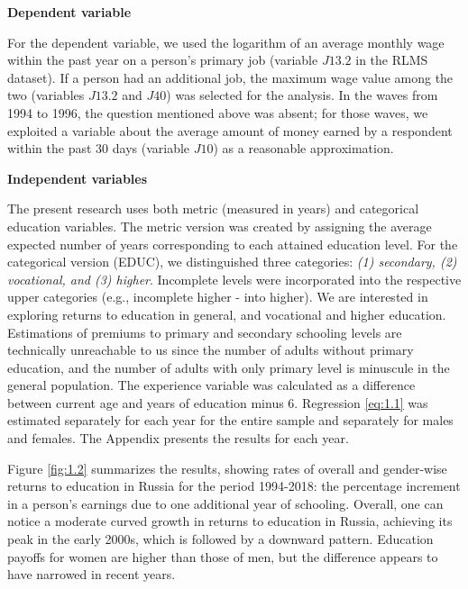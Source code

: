 \documentclass[alpha-refs]{wiley-article-01g}
\begin{document}

\textbf{Dependent variable}

For the dependent variable, we used the logarithm of an average monthly wage within the past year on a person's primary job (variable $J13.2$ in the RLMS dataset). If a person had an additional job, the maximum wage value among the two (variables $J13.2$ and $J40$) was selected for the analysis. In the waves from 1994 to 1996, the question mentioned above was absent; for those waves, we exploited a variable about the average amount of money earned by a respondent within the past 30 days (variable $J10$) as a reasonable approximation.

\textbf{Independent variables}

The present research uses both metric (measured in years) and categorical education variables. The metric version was created by assigning the average expected number of years corresponding to each attained education level. For the categorical version (EDUC), we distinguished three categories: \textit{(1) secondary, (2) vocational, and (3) higher}. Incomplete levels were incorporated into the respective upper categories (e.g., incomplete higher - into higher). We are interested in exploring returns to education in general, and vocational and higher education. Estimations of premiums to primary and secondary schooling levels are technically unreachable to us since the number of adults without primary education, and the number of adults with only primary level is minuscule in the general population. The experience variable was calculated as a difference between current age and years of education minus $6$. Regression \eqref{eq:1.1} was estimated separately for each year for the entire sample and separately for males and females. The Appendix presents the results for each year. 

Figure \ref{fig:1.2} summarizes the results, showing rates of overall and gender-wise returns to education in Russia for the period 1994-2018: the percentage increment in a person's earnings due to one additional year of schooling. Overall, one can notice a moderate curved growth in returns to education in Russia, achieving its peak in the early 2000s, which is followed by a downward pattern. Education payoffs for women are higher than those of men, but the difference appears to have narrowed in recent years.
\end{document}
